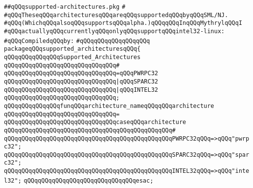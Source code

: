 \label{src/lib/compiler/front/basics/main/supported-architectures.pkg}
\verb|##qQQqsupported-architectures.pkg|\newline
\verb|#|\newline
\verb|#qQQqTheseqQQqarchitecturesqQQqareqQQqsupportedqQQqbyqQQqSML/NJ.|\newline
\verb|#qQQq(WhichqQQqalsoqQQqsupportsqQQqalpha.)qQQqqQQqInqQQqMythrylqQQqI|\newline
\verb|#qQQqactuallyqQQqcurrentlyqQQqonlyqQQqsupportqQQqintel32-linux:|\newline
\newline
\verb|#qQQqCompiledqQQqby:|\newline
\verb|#qQQqqQQqqQQqqQQqqQQq|\newline
\newline
\verb|packageqQQqsupported_architecturesqQQq{|\newline
\newline
\verb|qQQqqQQqqQQqqQQqSupported_Architectures|\newline
\verb|qQQqqQQqqQQqqQQqqQQqqQQqqQQqqQQq#|\newline
\verb|qQQqqQQqqQQqqQQqqQQqqQQqqQQqqQQq=qQQqPWRPC32|\newline
\verb|qQQqqQQqqQQqqQQqqQQqqQQqqQQqqQQq|\verb#|qQQqSPARC32#\newline
\verb|qQQqqQQqqQQqqQQqqQQqqQQqqQQqqQQq|\verb#|qQQqINTEL32#\newline
\verb|qQQqqQQqqQQqqQQqqQQqqQQqqQQqqQQq;|\newline
\newline
\verb|qQQqqQQqqQQqqQQqfunqQQqarchitecture_nameqQQqqQQqarchitecture|\newline
\verb|qQQqqQQqqQQqqQQqqQQqqQQqqQQqqQQq=|\newline
\verb|qQQqqQQqqQQqqQQqqQQqqQQqqQQqqQQqcaseqQQqarchitecture|\newline
\verb|qQQqqQQqqQQqqQQqqQQqqQQqqQQqqQQqqQQqqQQqqQQqqQQq#|\newline
\verb|qQQqqQQqqQQqqQQqqQQqqQQqqQQqqQQqqQQqqQQqqQQqqQQqPWRPC32qQQq=>qQQq"pwrpc32";|\newline
\verb|qQQqqQQqqQQqqQQqqQQqqQQqqQQqqQQqqQQqqQQqqQQqqQQqSPARC32qQQq=>qQQq"sparc32";|\newline
\verb|qQQqqQQqqQQqqQQqqQQqqQQqqQQqqQQqqQQqqQQqqQQqqQQqINTEL32qQQq=>qQQq"intel32";|\newline
\verb|qQQqqQQqqQQqqQQqqQQqqQQqqQQqqQQqesac;|\newline

